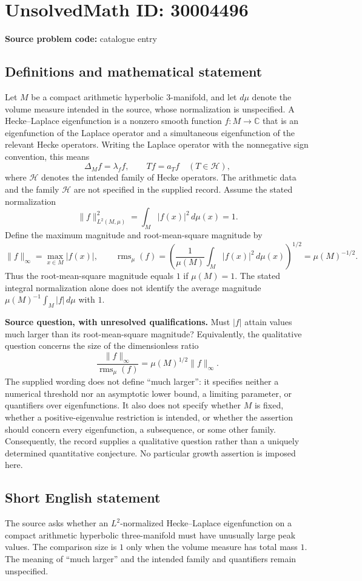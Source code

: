 \documentclass[11pt]{article}
\newcommand{\C}{\mathbb{C}}
\begin{document}
\section*{UnsolvedMath ID: 30004496}
\textbf{Source problem code:} catalogue entry
\subsection{Definitions and mathematical statement}
Let \(M\) be a compact arithmetic hyperbolic \(3\)-manifold, and let \(d\mu\) denote the volume measure intended in the source, whose normalization is unspecified. A Hecke--Laplace eigenfunction is a nonzero smooth function \(f:M\to\C\) that is an eigenfunction of the Laplace operator and a simultaneous eigenfunction of the relevant Hecke operators. Writing the Laplace operator with the nonnegative sign convention, this means
\[
\Delta_M f=\lambda_f f,\qquad T f=a_T f\quad(T\in\mathcal H),
\]
where \(\mathcal H\) denotes the intended family of Hecke operators. The arithmetic data and the family \(\mathcal H\) are not specified in the supplied record. Assume the stated normalization
\[
\|f\|_{L^2(M,\mu)}^2=\int_M |f(x)|^2\,d\mu(x)=1.
\]
Define the maximum magnitude and root-mean-square magnitude by
\[
\|f\|_\infty=\max_{x\in M}|f(x)|,
\qquad
\operatorname{rms}_\mu(f)=\left(\frac{1}{\mu(M)}\int_M|f(x)|^2\,d\mu(x)\right)^{1/2}
=\mu(M)^{-1/2}.
\]
Thus the root-mean-square magnitude equals \(1\) if \(\mu(M)=1\). The stated integral normalization alone does not identify the average magnitude \(\mu(M)^{-1}\int_M|f|\,d\mu\) with \(1\).

\textbf{Source question, with unresolved qualifications.} Must \(|f|\) attain values much larger than its root-mean-square magnitude? Equivalently, the qualitative question concerns the size of the dimensionless ratio
\[
\frac{\|f\|_\infty}{\operatorname{rms}_\mu(f)}
=\mu(M)^{1/2}\|f\|_\infty.
\]
The supplied wording does not define ``much larger'': it specifies neither a numerical threshold nor an asymptotic lower bound, a limiting parameter, or quantifiers over eigenfunctions. It also does not specify whether \(M\) is fixed, whether a positive-eigenvalue restriction is intended, or whether the assertion should concern every eigenfunction, a subsequence, or some other family. Consequently, the record supplies a qualitative question rather than a uniquely determined quantitative conjecture. No particular growth assertion is imposed here.
\subsection{Short English statement}
The source asks whether an \(L^2\)-normalized Hecke--Laplace eigenfunction on a compact arithmetic hyperbolic three-manifold must have unusually large peak values. The comparison size is \(1\) only when the volume measure has total mass \(1\). The meaning of ``much larger'' and the intended family and quantifiers remain unspecified.
\end{document}
